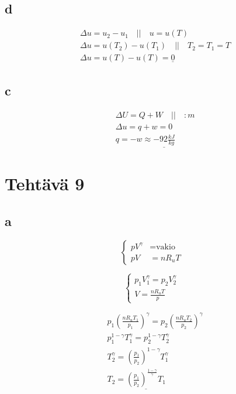 \documentclass[12pt,a4paper,finnish]{article}
\begin{document}
\subsection{d}

\begin{align}
&\Delta u = u_2 - u_1 \quad\bigg|\bigg|\quad u = u(T)\\
 &\Delta u = u(T_2) - u(T_1) \quad\bigg|\bigg|\quad T_2 = T_1 = T\\
 &\Delta u = u(T) - u(T) = \underline{0}
\end{align}

\subsection{c}

\begin{align}
 &\Delta U = Q + W \quad\bigg|\bigg|\quad :m\\
 &\Delta u = q + w = 0\\
 &q = -w \approx \underline{-92\frac{kJ}{kg}}
\end{align}

\section{Tehtävä 9}

\subsection{a}

\begin{equation}
\left\{
 \begin{aligned}
    pV^\gamma &= \text{vakio}\\
    pV &= nR_uT
 \end{aligned}\right.
\end{equation}

\begin{equation}
\left\{
 \begin{aligned}
    p_1V_1^\gamma = p_2V_2^\gamma\\
    V = \frac{nR_uT}{p}
 \end{aligned}\right.
\end{equation}

\begin{align}
 &p_1\left(\frac{nR_uT_1}{p_1}\right)^\gamma = p_2\left(\frac{nR_uT_2}{p_2}\right)^\gamma\\
 &p_1^{1-\gamma}T_1^\gamma = p_2^{1-\gamma}T_2^\gamma\\
 &T_2^\gamma = \left(\frac{p_1}{p_2}\right)^{1-\gamma}T_1^\gamma\\
 &T_2 = \underline{\left(\frac{p_1}{p_2}\right)^{\frac{1-\gamma}{\gamma}}T_1}
\end{align}
\end{document}
